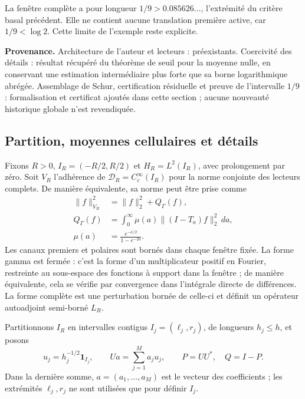 La fenêtre complète a pour longueur \(1/9>0.085626\ldots\), l'extrémité
du critère basal précédent. Elle ne contient aucune translation première active,
car \(1/9<\log2\). Cette limite de l'exemple reste explicite.

\textbf{Provenance.} Architecture de l'auteur et lecteurs : préexistants. Coercivité
des détails : résultat récupéré du théorème de seuil pour la moyenne nulle, en conservant une estimation
intermédiaire plus forte que sa borne logarithmique abrégée. Assemblage de Schur,
certification résiduelle et preuve de l'intervalle \(1/9\) : formalisation et
certificat ajoutés dans cette section ; aucune nouveauté historique globale n'est revendiquée.

\subsection{Partition, moyennes cellulaires et détails}
\label{viii:schur-add-sub-46}

Fixons \(R>0\), \(I_R=(-R/2,R/2)\) et \(H_R=L^2(I_R)\), avec prolongement par zéro. Soit \(V_R\) l'adhérence de \(\mathcal D_R=C_c^\infty(I_R)\) pour la norme conjointe des lecteurs complets. De manière équivalente, sa norme peut être prise comme
\begin{equation}
\begin{aligned}
\|f\|_{V_R}^2&=\|f\|_2^2+Q_\Gamma(f),\\
Q_\Gamma(f)&=\int_0^\infty\mu(a)\|(I-T_a)f\|_2^2\,da,\\
\mu(a)&=\frac{e^{-a/2}}{1-e^{-2a}}.
\end{aligned}
\label{viii:schur-add-display-2}
\end{equation}
Les canaux premiers et polaires sont bornés dans chaque fenêtre fixée.
La forme gamma est fermée : c'est la forme d'un multiplicateur positif
en Fourier, restreinte au sous-espace des fonctions à support dans la
fenêtre ; de manière équivalente, cela se vérifie par convergence dans l'intégrale
directe de différences. La forme complète est une perturbation bornée
de celle-ci et définit un opérateur autoadjoint semi-borné \(L_R\).

Partitionnons \(I_R\) en intervalles contigus \(I_j=(\ell_j,r_j)\), de longueurs \(h_j\leq h\), et posons
\begin{equation}
u_j=h_j^{-1/2}\mathbf1_{I_j},\qquad
Ua=\sum_{j=1}^M a_j u_j,\qquad P=UU^*,\quad Q=I-P.
\label{viii:schur-add-display-3}
\end{equation}
Dans la dernière somme, \(a=(a_1,\ldots,a_M)\) est le vecteur des coefficients ;
les extrémités \(\ell_j,r_j\) ne sont utilisées que pour définir \(I_j\).

